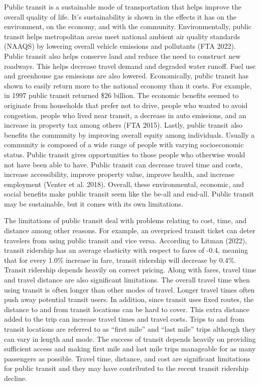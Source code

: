 \documentclass[12pt, oneside, openright]{byuthesis}
\begin{document}
Public transit is a sustainable mode of transportation that helps improve the overall quality of life. It's sustainability is shown in the effects it has on the environment, on the economy, and with the community. Environmentally, public transit helps metropolitan areas meet national ambient air quality standards (NAAQS) by lowering overall vehicle emissions and pollutants (FTA 2022). Public transit also helps conserve land and reduce the need to construct new roadways. This helps decrease travel demand and degraded water runoff. Fuel use and greenhouse gas emissions are also lowered. Economically, public transit has shown to easily return more to the national economy than it costs. For example, in 1997 public transit returned \$26 billion. The economic benefits seemed to originate from households that prefer not to drive, people who wanted to avoid congestion, people who lived near transit, a decrease in auto emissions, and an increase in property tax among others (FTA 2015). Lastly, public transit also benefits the community by improving overall equity among individuals. Usually a community is composed of a wide range of people with varying socioeconomic status. Public transit gives opportunities to those people who otherwise would not have been able to have. Public transit can decrease travel time and costs, increase accessibility, improve property value, improve health, and increase employment (Venter et al. 2018). Overall, these environmental, economic, and social benefits make public transit seem like the be-all and end-all. Public transit may be sustainable, but it comes with its own limitations.

The limitations of public transit deal with problems relating to cost, time, and distance among other reasons. For example, an overpriced transit ticket can deter travelers from using public transit and vice versa. According to Litman (2022), transit ridership has an average elasticity with respect to fares of -0.4, meaning that for every 1.0\% increase in fare, transit ridership will decrease by 0.4\%. Transit ridership depends heavily on correct pricing. Along with fares, travel time and travel distance are also significant limitations. The overall travel time when using transit is often longer than other modes of travel. Longer travel times often push away potential transit users. In addition, since transit uses fixed routes, the distance to and from transit locations can be hard to cover. This extra distance added to the trip can increase travel times and travel costs. Trips to and from transit locations are referred to as ``first mile'' and ``last mile'' trips although they can vary in length and mode. The success of transit depends heavily on providing sufficient access and making first mile and last mile trips manageable for as many passengers as possible. Travel time, distance, and cost are significant limitations for public transit and they may have contributed to the recent transit ridership decline.
\end{document}
